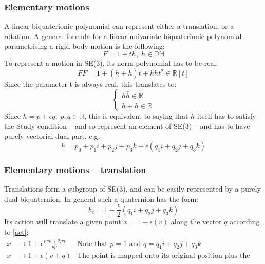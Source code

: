 \subsubsection{Elementary motions}
A linear biquaterionic polynomial can represent either a translation, or a rotation. 
A general formula for a linear univariate biquaterionic polynomial parametrising a rigid body motion is the following:
\begin{equation}
    F = 1+th,\; h \in \mathbb{DH}
\end{equation}
To represent a motion in SE(3), its norm polynomial has to be real:
\begin{equation}
    F\bar{F} = 1+(h+\bar{h})t+h\bar{h}t^{2} \in \mathbb{R}[t]
\end{equation}
Since the parameter t is always real, this translates to:
\begin{equation}
    \begin{cases}
        h\bar{h} \in \mathbb{R}\\
        h+\bar{h} \in \mathbb{R}
    \end{cases}
\end{equation}
Since $h = p + \epsilon q,\; p,q \in \mathbb{H}$, this is equivalent to saying that $h$ itself has to satisfy the Study condition -- and so represent an element of SE(3) -- and has to have purely vectorial dual part, e.g.
\begin{equation}
    h = p_0+p_1\mathit{i}+p_2\mathit{j}+p_3\mathit{k} +\epsilon(q_1\mathit{i}+q_2\mathit{j}+q_3\mathit{k})
\end{equation}
\subsubsection{Elementary motions -- translation}
Translations form a subgroup of SE(3), and can be easily represented by a purely dual biquaternion. In general such a quaternion has the form:
\begin{equation}
    h_t = 1 - \frac{\epsilon}{2}(q_1\mathit{i}+q_2\mathit{j}+q_3\mathit{k})
\end{equation}
Its action will translate a given point $x = 1 + \epsilon(v)$ along the vector $q$ according to \ref{act}:
\begin{equation}
    \begin{aligned}
        x &\rightarrow 1 + \epsilon\frac{pv\bar{p} + 2p\bar{q}}{p\bar{p}}&\mbox{Note that $p = 1$ and  $q = q_1\mathit{i}+q_2\mathit{j}+q_3\mathit{k}$}\\[1.25ex]
        x&\rightarrow 1 + \epsilon(v + q)&\mbox{The point is mapped onto its original position plus the translation vector}\\[1.25ex]
    \end{aligned}
\end{equation}

